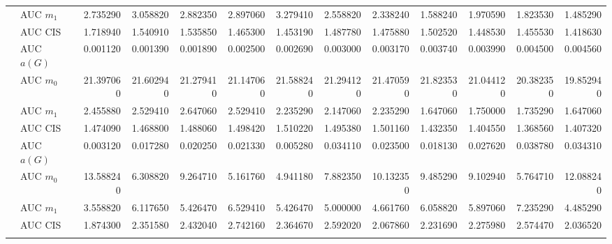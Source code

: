 \begin{table}[htbp]
\begin{tabular}{llrrrrrrrrrrr}
    & AUC $m_1$ & 2.735290 & 3.058820 & 2.882350 & 2.897060 & 3.279410 & 2.558820 & 2.338240 & 1.588240 & 1.970590 & 1.823530 & 1.485290 \\
    & AUC CIS & 1.718940 & 1.540910 & 1.535850 & 1.465300 & 1.453190 & 1.487780 & 1.475880 & 1.502520 & 1.448530 & 1.455530 & 1.418630 \\
    \addlinespace
    \multirow{4}{*}{degree} & AUC $a(G)$ & 0.001120 & 0.001390 & 0.001890 & 0.002500 & 0.002690 & 0.003000 & 0.003170 & 0.003740 & 0.003990 & 0.004500 & 0.004560 \\
    & AUC $m_0$ & 21.397060 & 21.602940 & 21.279410 & 21.147060 & 21.588240 & 21.294120 & 21.470590 & 21.823530 & 21.044120 & 20.382350 & 19.852940 \\
    & AUC $m_1$ & 2.455880 & 2.529410 & 2.647060 & 2.529410 & 2.235290 & 2.147060 & 2.235290 & 1.647060 & 1.750000 & 1.735290 & 1.647060 \\
    & AUC CIS & 1.474090 & 1.468800 & 1.488060 & 1.498420 & 1.510220 & 1.495380 & 1.501160 & 1.432350 & 1.404550 & 1.368560 & 1.407320 \\
    \addlinespace
    \multirow{4}{*}{random} & AUC $a(G)$ & 0.003120 & 0.017280 & 0.020250 & 0.021330 & 0.005280 & 0.034110 & 0.023500 & 0.018130 & 0.027620 & 0.038780 & 0.034310 \\
    & AUC $m_0$ & 13.588240 & 6.308820 & 9.264710 & 5.161760 & 4.941180 & 7.882350 & 10.132350 & 9.485290 & 9.102940 & 5.764710 & 12.088240 \\
    & AUC $m_1$ & 3.558820 & 6.117650 & 5.426470 & 6.529410 & 5.426470 & 5.000000 & 4.661760 & 6.058820 & 5.897060 & 7.235290 & 4.485290 \\
    & AUC CIS & 1.874300 & 2.351580 & 2.432040 & 2.742160 & 2.364670 & 2.592020 & 2.067860 & 2.231690 & 2.275980 & 2.574470 & 2.036520 \\
    \addlinespace
    \bottomrule
  \end{tabular}
\end{table}

